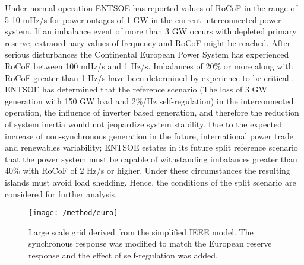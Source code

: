 Under normal operation ENTSOE has reported values of RoCoF in the range of 5-10 mHz/s for power outages of 1 GW in the current interconnected power system. If an imbalance event of more than 3 GW occurs with depleted primary reserve, extraordinary values of frequency and RoCoF might be reached. After serious disturbances the Continental European Power System has experienced RoCoF between 100 mHz/s and 1 Hz/s. Imbalances of 20\% or more along with RoCoF greater than 1 Hz/s have been determined by experience to be critical \cite{ENTSOE.2016}. ENTSOE has determined that the reference scenario (The loss of 3 GW generation with 150 GW load and 2\%/Hz self-regulation) in the interconnected operation, the influence of inverter based generation, and therefore the reduction of system inertia would not jeopardize system stability. Due to the expected increase of non-synchronous generation in the future, international power trade and renewables variability; ENTSOE estates in its future split reference scenario that the power system must be capable of withstanding imbalances greater than 40\% with RoCoF of 2 Hz/s or higher. Under these circumstances the resulting islands must avoid load shedding. Hence, the conditions of the split scenario are considered for further analysis.
\begin{figure}[h]
	\centering
	\texttt{[image: /method/euro]}
	\caption{Large scale grid derived from the simplified IEEE model. The synchronous response was modified to match the European reserve response and the effect of self-regulation was added.}
	\label{fig:euro}
\end{figure}

